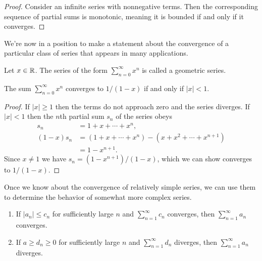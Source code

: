 \documentclass[../m131main.tex]{subfiles}
\begin{document}
\begin{proof}
    Consider an infinite series with nonnegative terms.
    Then the corresponding sequence of partial sums is monotonic, meaning it is bounded if and only if it converges.
\end{proof}

We're now in a position to make a statement about the convergence of a particular class of series that appears in many applications.

\begin{definition}
    Let $x \in \mathbb{R}$.
    The series of the form $\sum_{n=0}^{\infty} x^{n}$ is called a geometric series.
\end{definition}

\begin{theorem}
    The sum $\sum_{n=0}^{\infty} x^{n}$ converges to $1 / (1-x)$ if and only if $|x| < 1$.
\end{theorem}

\begin{proof}
    If $|x| \geq 1$ then the terms do not approach zero and the series diverges.
    If $|x| < 1$ then the $n$th partial sum $s_n$ of the series obeys
    \begin{align*}
        s_n &= 1 + x + \cdots + x^{n}, \\
        (1-x)s_n &= (1 + x + \cdots + x^{n}) - (x + x^2 + \cdots + x^{n+1}) \\
        &= 1 - x^{n+1}.
    \end{align*}
    Since $x \neq 1$ we have $s_n = (1 - x^{n+1}) / (1-x)$, which we can show converges to $1 / (1 - x)$.
\end{proof}

Once we know about the convergence of relatively simple series, we can use them to determine the behavior of somewhat more complex series.

\begin{theorem}
    \begin{enumerate}[label=(\alph*)]
        \item If $|a_n| \leq c_n$ for sufficiently large $n$ and $\sum_{n=1}^{\infty}c_n$ converges, then $\sum_{n=1}^{\infty}a_n$ converges.
        \item If $a \geq d_n \geq 0$ for sufficiently large $n$ and $\sum_{n=1}^{\infty}d_n$ diverges, then $\sum_{n=1}^{\infty}a_n$ diverges.
    \end{enumerate}
\end{theorem}
\end{document}
